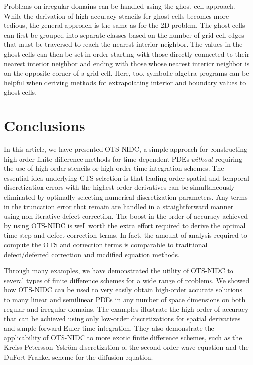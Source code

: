 \documentclass[fleqn,12pt,twoside]{article}
\begin{document}
Problems on irregular domains can be handled using the ghost cell approach. 
While the derivation of high accuracy stencils for ghost cells becomes more
tedious, the general approach is the same as for the 2D problem.  The ghost 
cells can first be grouped into separate classes based on the number of 
grid cell edges that must be traversed to reach the nearest interior neighbor.
The values in the ghost cells can then be set in order starting with those 
directly connected to their nearest interior neighbor and ending with those 
whose nearest interior neighbor is on the opposite corner of a grid cell.
Here, too, symbolic algebra programs can be helpful when deriving methods for 
extrapolating interior and boundary values to ghost cells.


\section{\label{sec:conclusions} Conclusions} 
In this article, we have presented OTS-NIDC, a simple approach for
constructing high-order finite difference methods for time dependent PDEs
\emph{without} requiring the use of high-order stencils or high-order time
integration schemes.  The essential idea underlying OTS selection is that 
leading order spatial and temporal discretization errors with the highest
order derivatives can be simultaneously eliminated by optimally selecting
numerical discretization parameters.  Any terms in the truncation error that
remain are handled in a straightforward manner using non-iterative defect
correction.  The boost in the order of accuracy achieved by using OTS-NIDC is
well worth the extra effort required to derive the optimal time step and
defect correction terms.  In fact, the amount of analysis required to compute
the OTS and correction terms is comparable to traditional defect/deferred
correction and modified equation methods.

Through many examples, we have demonstrated the utility of OTS-NIDC to several
types of finite difference schemes for a wide range of problems.  We showed
how OTS-NIDC can be used to very easily obtain high-order accurate solutions to
many linear and semilinear PDEs in any number of space dimensions on both
regular and irregular domains.  The examples illustrate the high-order of
accuracy that can be achieved using only low-order discretizations for spatial
derivatives and simple forward Euler time integration.  They also demonstrate
the applicability of OTS-NIDC to more exotic finite difference schemes, such as
the Kreiss-Petersson-Ystr\"om discretization of the second-order wave equation
and the DuFort-Frankel scheme for the diffusion equation.
\end{document}
